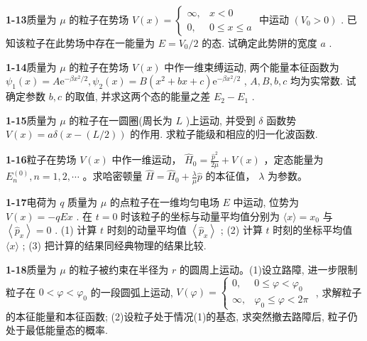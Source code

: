 \vfill

\newpage
\vfill

\noindent
\textbf{1-13}\quad 质量为 $\mu$ 的粒子在势场 $V(x) = \begin{cases} \infty, & x < 0 \\ 0, & 0 \leqslant x \leqslant a \end{cases}$ 中运动 $(V_0 > 0)$ . 已知该粒子在此势场中存在一能量为 $E = V_0 / 2$ 的态. 试确定此势阱的宽度 $a$ .

\vfill

\newpage
\vfill

\noindent
\textbf{1-14}\quad 质量为 $\mu$ 的粒子在势场 $V(x)$ 中作一维束缚运动, 两个能量本征函数为 $\psi_{1}(x) = A\mathrm{e}^{-\beta x^{2} / 2}, \psi_{2}(x) = B(x^{2} + bx + c)\mathrm{e}^{-\beta x^{2} / 2}$ , $A, B, b, c$ 均为实常数. 试确定参数 $b, c$ 的取值, 并求这两个态的能量之差 $E_{2} - E_{1}$ .

\vfill

\newpage
\vfill

\noindent
\textbf{1-15}\quad 质量为 $\mu$ 的粒子在一圆圈(周长为 $L$ )上运动, 并受到 $\delta$ 函数势 $V(x) = a\delta (x - (L / 2))$ 的作用. 求粒子能级和相应的归一化波函数.

\vfill

\newpage
\vfill

\noindent
\textbf{1-16}\quad 粒子在势场 $V(x)$ 中作一维运动， $\hat{H}_{0}=\frac{\hat{p}^{2}}{2\mu}+V(x)$ ，定态能量为 $E_{n}^{(0)}, n=1,2,\cdots$ 。求哈密顿量 $\hat{H}=\hat{H}_{0}+\frac{\lambda}{\mu}\hat{p}$ 的本征值， $\lambda$ 为参数。

\vfill

\newpage
\vfill

\noindent
\textbf{1-17}\quad 电荷为 $q$ 质量为 $\mu$ 的点粒子在一维均匀电场 $E$ 中运动, 位势为 $V(x) = -qEx$ . 在 $t = 0$ 时该粒子的坐标与动量平均值分别为 $\langle x \rangle = x_0$ 与 $\left\langle \hat{p}_x \right\rangle = 0$ . (1) 计算 $t$ 时刻的动量平均值 $\left\langle \hat{p}_x \right\rangle$ ; (2) 计算 $t$ 时刻的坐标平均值 $\langle x \rangle$ ; (3) 把计算的结果同经典物理的结果比较.

\vfill

\newpage
\vfill

\noindent
\textbf{1-18}\quad 质量为 $\mu$ 的粒子被约束在半径为 $r$ 的圆周上运动。(1)设立路障, 进一步限制粒子在 $0 < \varphi < \varphi_0$ 的一段圆弧上运动, $V(\varphi) = \begin{cases} 0, & 0 \leqslant \varphi < \varphi_0 \\ \infty, & \varphi_0 \leqslant \varphi < 2\pi \end{cases}$ , 求解粒子的本征能量和本征函数; (2)设粒子处于情况(1)的基态, 求突然撤去路障后, 粒子仍处于最低能量态的概率.

